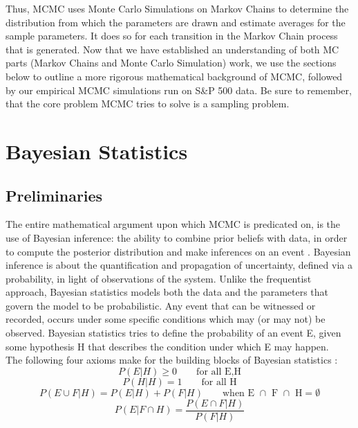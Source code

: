 \documentclass[letterpaper]{article}
\begin{document}
	
	
	Thus, MCMC uses Monte Carlo Simulations on Markov Chains to determine the distribution from which the parameters are drawn and estimate averages for the sample parameters. It does so for each transition in the Markov Chain process that is generated. Now that we have established an understanding of both MC parts (Markov Chains and Monte Carlo Simulation) work, we use the sections below to outline a more rigorous mathematical background of MCMC, followed by our empirical MCMC simulations run on S\&P 500 data. Be sure to remember, that the core problem MCMC tries to solve is a sampling problem.
	
	\section{Bayesian Statistics}
	\subsection{Preliminaries}
	The entire mathematical argument upon which MCMC is predicated on, is the use of Bayesian inference: the ability to combine prior beliefs with data, in order to compute the posterior distribution and make inferences on an event \cite{tsay2002}. Bayesian inference is about the quantification and propagation of uncertainty, defined via a probability, in light of observations of the
	system. Unlike the frequentist approach, Bayesian statistics models both the data and the parameters that govern the model to be probabilistic. 
	Any event that can be witnessed or recorded, occurs under some specific conditions which may (or may not) be observed. Bayesian statistics tries to define the probability of an event E, given some hypothesis H that describes the condition under which E may happen.  \\
	The following four axioms make for the building blocks of Bayesian statistics \cite{lee2012bayesian}:
	\begin{equation}
	P(E|H) \geq 0 \qquad \text{for all E,H}
	\label{eq:Ax1} 
	\end{equation}
	\begin{equation}
	P(H|H) = 1 \qquad \text{for all H}
	\label{eq:Ax2}
	\end{equation}
	\begin{equation}
	P(E \cup F |H) = P(E|H) + P(F|H) \qquad \text{when E $\cap$ F  $\cap$ H} = \emptyset 
	\label{eq:Ax3} 
	\end{equation}
	\begin{equation}
	P(E|F\cap H) = \frac{P(E \cap F|H)}{P(F|H)}
	\label{eq:Ax4} 
	\end{equation}
	
\end{document}
